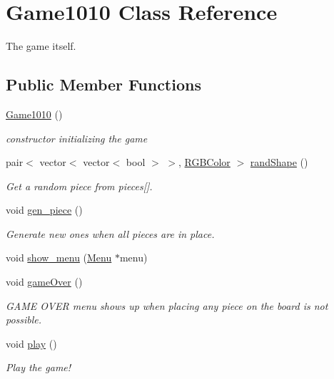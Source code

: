 \hypertarget{class_game1010}{}\section{Game1010 Class Reference}
\label{class_game1010}


The game itself.  


\subsection*{Public Member Functions}
\begin{DoxyCompactItemize}
\item 
\mbox{\hyperlink{class_game1010_a0a0688219844edbe8f4a44c11a13e32a}{Game1010}} ()
\begin{DoxyCompactList}\small\item\em constructor initializing the game \end{DoxyCompactList}\item 
pair$<$ vector$<$ vector$<$ bool $>$ $>$, \mbox{\hyperlink{class_r_g_b_color}{R\+G\+B\+Color}} $>$ \mbox{\hyperlink{class_game1010_a9b86f7bf4ad3af111014ad33a781ffe5}{rand\+Shape}} ()
\begin{DoxyCompactList}\small\item\em Get a random piece from pieces\mbox{[}\mbox{]}. \end{DoxyCompactList}\item 
void \mbox{\hyperlink{class_game1010_a9576170947a355682c922cb648432b9e}{gen\+\_\+piece}} ()
\begin{DoxyCompactList}\small\item\em Generate new ones when all pieces are in place. \end{DoxyCompactList}\item 
void \mbox{\hyperlink{class_game1010_a99d6f53c3073861fe37ef67caa073840}{show\+\_\+menu}} (\mbox{\hyperlink{class_menu}{Menu}} $\ast$menu)
\item 
void \mbox{\hyperlink{class_game1010_a3bc296b7ba6bffeda3baceb1240190b6}{game\+Over}} ()
\begin{DoxyCompactList}\small\item\em G\+A\+ME O\+V\+ER menu shows up when placing any piece on the board is not possible. \end{DoxyCompactList}\item 
void \mbox{\hyperlink{class_game1010_afa18a3a81b8966417a228459a5bebf53}{play}} ()
\begin{DoxyCompactList}\small\item\em Play the game! \end{DoxyCompactList}\end{DoxyCompactItemize}


